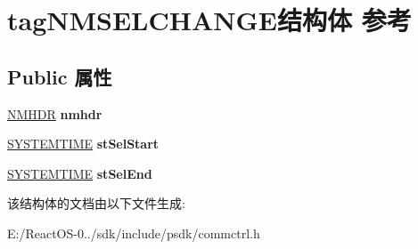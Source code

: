 \hypertarget{structtag_n_m_s_e_l_c_h_a_n_g_e}{}\section{tag\+N\+M\+S\+E\+L\+C\+H\+A\+N\+G\+E结构体 参考}
\label{structtag_n_m_s_e_l_c_h_a_n_g_e}
\subsection*{Public 属性}
\begin{DoxyCompactItemize}
\item 
\mbox{\label{structtag_n_m_s_e_l_c_h_a_n_g_e_abfce5b1e6cacbcbde2913c216b88544c}} 
\hyperlink{structtag_n_m_h_d_r}{N\+M\+H\+DR} {\bfseries nmhdr}
\item 
\mbox{\label{structtag_n_m_s_e_l_c_h_a_n_g_e_a67c3f88097a9462d472d1eaba6f1b511}} 
\hyperlink{struct___s_y_s_t_e_m_t_i_m_e}{S\+Y\+S\+T\+E\+M\+T\+I\+ME} {\bfseries st\+Sel\+Start}
\item 
\mbox{\label{structtag_n_m_s_e_l_c_h_a_n_g_e_aa3bcdad98ff471153395523a31ac8f34}} 
\hyperlink{struct___s_y_s_t_e_m_t_i_m_e}{S\+Y\+S\+T\+E\+M\+T\+I\+ME} {\bfseries st\+Sel\+End}
\end{DoxyCompactItemize}


该结构体的文档由以下文件生成\+:\begin{DoxyCompactItemize}
\item 
E\+:/\+React\+O\+S-\/0../sdk/include/psdk/commctrl.\+h\end{DoxyCompactItemize}
